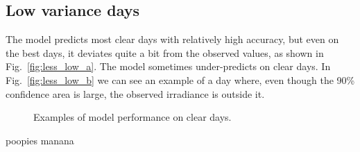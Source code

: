 \subsection{Low variance days}
The model predicts most clear days with relatively high accuracy, but even on the best days, it deviates quite a bit from the observed values, as shown in Fig.~\ref{fig:less_low_a}. The model sometimes under-predicts on clear days. In Fig.~\ref{fig:less_low_b} we can see an example of a day where, even though the 90\% confidence area is large, the observed irradiance is outside it.
\begin{figure}[ht!]
    \centering
    \qquad
    \qquad
    \caption{Examples of model performance on clear days.
    \label{fig:less_low}}
\end{figure}
poopies manana 

